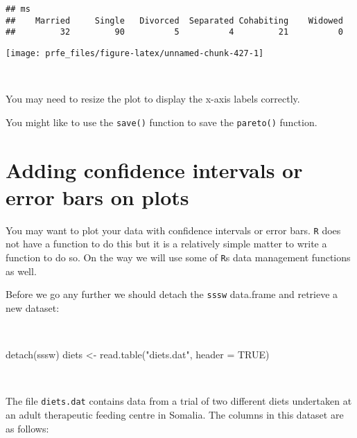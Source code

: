\documentclass[
  12pt,
  a4paper]{book}
\newenvironment{Shaded}{\begin{snugshade}}{\end{snugshade}}
\newcommand{\AttributeTok}[1]{\textcolor[rgb]{0.77,0.63,0.00}{#1}}
\newcommand{\ConstantTok}[1]{\textcolor[rgb]{0.00,0.00,0.00}{#1}}
\newcommand{\FunctionTok}[1]{\textcolor[rgb]{0.00,0.00,0.00}{#1}}
\newcommand{\NormalTok}[1]{#1}
\newcommand{\OtherTok}[1]{\textcolor[rgb]{0.56,0.35,0.01}{#1}}
\newcommand{\StringTok}[1]{\textcolor[rgb]{0.31,0.60,0.02}{#1}}
\begin{document}
\begin{verbatim}
## ms
##    Married     Single   Divorced  Separated Cohabiting    Widowed 
##         32         90          5          4         21          0
\end{verbatim}

\begin{center}\texttt{[image: prfe\_files/figure-latex/unnamed-chunk-427-1]} \end{center}

~

You may need to resize the plot to display the x-axis labels correctly.

You might like to use the \texttt{save()} function to save the \texttt{pareto()} function.

\newpage

\hypertarget{adding-confidence-intervals-or-error-bars-on-plots}{%
\section{Adding confidence intervals or error bars on plots}\label{adding-confidence-intervals-or-error-bars-on-plots}}

You may want to plot your data with confidence intervals or error bars. \texttt{R} does not have a function to do this but it is a relatively simple matter to write a function to do so. On the way we will use some of \texttt{R}s data management functions as well.

Before we go any further we should detach the \texttt{sssw} data.frame and retrieve a new dataset:

~

\begin{Shaded}
\begin{Highlighting}[]
\FunctionTok{detach}\NormalTok{(sssw)}
\NormalTok{diets }\OtherTok{\textless{}{-}} \FunctionTok{read.table}\NormalTok{(}\StringTok{"diets.dat"}\NormalTok{, }\AttributeTok{header =} \ConstantTok{TRUE}\NormalTok{)}
\end{Highlighting}
\end{Shaded}

~

The file \texttt{diets.dat} contains data from a trial of two different diets undertaken at an adult therapeutic feeding centre in Somalia. The columns in this dataset are as follows:

~
\end{document}
